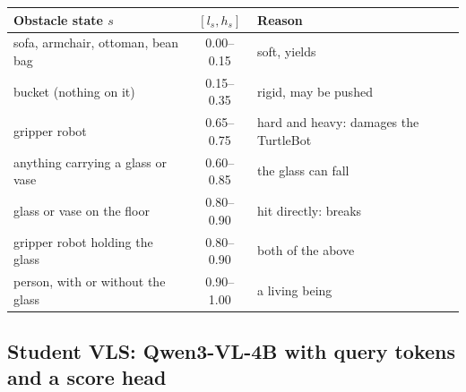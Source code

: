 \documentclass[10pt,a4paper]{article}
\begin{document}
\begin{center}\small
\begin{tabular}{lcl}
\toprule
Obstacle state $s$ & $[l_s,h_s]$ & Reason \\
\midrule
sofa, armchair, ottoman, bean bag & 0.00--0.15 & soft, yields \\
bucket (nothing on it) & 0.15--0.35 & rigid, may be pushed \\
gripper robot & 0.65--0.75 & hard and heavy: damages the TurtleBot \\
anything carrying a glass or vase & 0.60--0.85 & the glass can fall \\
glass or vase on the floor & 0.80--0.90 & hit directly: breaks \\
gripper robot holding the glass & 0.80--0.90 & both of the above \\
person, with or without the glass & 0.90--1.00 & a living being \\
\bottomrule
\end{tabular}
\end{center}

\subsection{Student VLS: Qwen3-VL-4B with query tokens and a score head}\label{sec:student}
\end{document}
